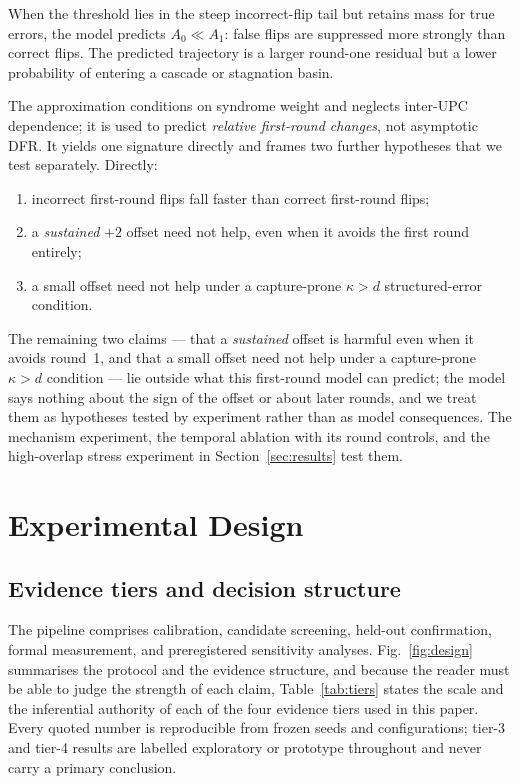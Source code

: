 \documentclass[lettersize,journal]{IEEEtran}
\begin{document}
When the threshold lies in the steep incorrect-flip tail but retains mass for true errors, the model predicts $A_0\ll A_1$: false flips are suppressed more strongly than correct flips. The predicted trajectory is a larger round-one residual but a lower probability of entering a cascade or stagnation basin.

The approximation conditions on syndrome weight and neglects inter-UPC dependence; it is used to predict \emph{relative first-round changes}, not asymptotic DFR. It yields one signature directly and frames two further hypotheses that we test separately. Directly:

\begin{enumerate}[label=(\roman*),leftmargin=1.7em,itemsep=0.1em,topsep=0.2em]
\item incorrect first-round flips fall faster than correct first-round flips;
\item a \emph{sustained} $+2$ offset need not help, even when it avoids the first round entirely;
\item a small offset need not help under a capture-prone $\kappa>d$ structured-error condition.
\end{enumerate}

The remaining two claims --- that a \emph{sustained} offset is harmful even when it avoids round~1, and that a small offset need not help under a capture-prone $\kappa>d$ condition --- lie outside what this first-round model can predict; the model says nothing about the sign of the offset or about later rounds, and we treat them as hypotheses tested by experiment rather than as model consequences. The mechanism experiment, the temporal ablation with its round controls, and the high-overlap stress experiment in Section~\ref{sec:results} test them.

\section{Experimental Design}\label{sec:method}

\subsection{Evidence tiers and decision structure}

The pipeline comprises calibration, candidate screening, held-out confirmation, formal measurement, and preregistered sensitivity analyses. Fig.~\ref{fig:design} summarises the protocol and the evidence structure, and because the reader must be able to judge the strength of each claim, Table~\ref{tab:tiers} states the scale and the inferential authority of each of the four evidence tiers used in this paper. Every quoted number is reproducible from frozen seeds and configurations; tier-3 and tier-4 results are labelled exploratory or prototype throughout and never carry a primary conclusion.
\end{document}
